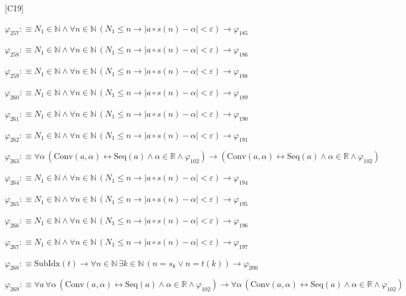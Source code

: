 \begin{fullproof}{[C19]}
\begin{abbrevlist}
\item $\varphi_{257} :\equiv N_{1} \in \mathbb{N} \land \forall n \in \mathbb{N}\,(N_{1} \leq n \to \lvert a \circ s(n) - \alpha \rvert < \varepsilon) \to \varphi_{185}$
\item $\varphi_{258} :\equiv N_{1} \in \mathbb{N} \land \forall n \in \mathbb{N}\,(N_{1} \leq n \to \lvert a \circ s(n) - \alpha \rvert < \varepsilon) \to \varphi_{186}$
\item $\varphi_{259} :\equiv N_{1} \in \mathbb{N} \land \forall n \in \mathbb{N}\,(N_{1} \leq n \to \lvert a \circ s(n) - \alpha \rvert < \varepsilon) \to \varphi_{188}$
\item $\varphi_{260} :\equiv N_{1} \in \mathbb{N} \land \forall n \in \mathbb{N}\,(N_{1} \leq n \to \lvert a \circ s(n) - \alpha \rvert < \varepsilon) \to \varphi_{189}$
\item $\varphi_{261} :\equiv N_{1} \in \mathbb{N} \land \forall n \in \mathbb{N}\,(N_{1} \leq n \to \lvert a \circ s(n) - \alpha \rvert < \varepsilon) \to \varphi_{190}$
\item $\varphi_{262} :\equiv N_{1} \in \mathbb{N} \land \forall n \in \mathbb{N}\,(N_{1} \leq n \to \lvert a \circ s(n) - \alpha \rvert < \varepsilon) \to \varphi_{191}$
\item $\varphi_{263} :\equiv \forall \alpha\,(\mathrm{Conv}(a,\alpha) \leftrightarrow \mathrm{Seq}(a) \land \alpha \in \mathbb{R} \land \varphi_{102}) \to (\mathrm{Conv}(a,\alpha) \leftrightarrow \mathrm{Seq}(a) \land \alpha \in \mathbb{R} \land \varphi_{102})$
\item $\varphi_{264} :\equiv N_{1} \in \mathbb{N} \land \forall n \in \mathbb{N}\,(N_{1} \leq n \to \lvert a \circ s(n) - \alpha \rvert < \varepsilon) \to \varphi_{194}$
\item $\varphi_{265} :\equiv N_{1} \in \mathbb{N} \land \forall n \in \mathbb{N}\,(N_{1} \leq n \to \lvert a \circ s(n) - \alpha \rvert < \varepsilon) \to \varphi_{195}$
\item $\varphi_{266} :\equiv N_{1} \in \mathbb{N} \land \forall n \in \mathbb{N}\,(N_{1} \leq n \to \lvert a \circ s(n) - \alpha \rvert < \varepsilon) \to \varphi_{196}$
\item $\varphi_{267} :\equiv N_{1} \in \mathbb{N} \land \forall n \in \mathbb{N}\,(N_{1} \leq n \to \lvert a \circ s(n) - \alpha \rvert < \varepsilon) \to \varphi_{197}$
\item $\varphi_{268} :\equiv \mathrm{SubIdx}(t) \to \forall n \in \mathbb{N}\,\exists k \in \mathbb{N}\,(n = s_{k} \lor n = t(k)) \to \varphi_{200}$
\item $\varphi_{269} :\equiv \forall a\,\forall \alpha\,(\mathrm{Conv}(a,\alpha) \leftrightarrow \mathrm{Seq}(a) \land \alpha \in \mathbb{R} \land \varphi_{102}) \to \forall \alpha\,(\mathrm{Conv}(a,\alpha) \leftrightarrow \mathrm{Seq}(a) \land \alpha \in \mathbb{R} \land \varphi_{102})$

\end{abbrevlist}
\end{fullproof}

